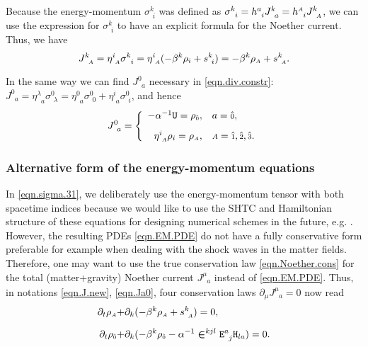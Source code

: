 \documentclass[
10pt, %
a4paper, %
oneside, %
twocolumn,
headinclude,footinclude, %
BCOR5mm, %
]{scrartcl}
\newcommand{\sA}{\mathsmaller A}
\newcommand{\pd}[1]{\partial_{#1}}
\newcommand{\tetrsymbol}{h}
\newcommand{\itetrsymbol}{\eta}
\newcommand{\itetr}[2]{\itetrsymbol^{#1}_{\phantom{#1}#2}}
\newcommand{\tetr}[2]{\tetrsymbol^{#1}_{\phantom{#1}#2}}
\newcommand{\stress}[2]{s_{\ #1}^{#2}}
\newcommand{\Hfin}[2]{\mathtt{H}_{#2#1}}	%
\newcommand{\Efin}[2]{\mathtt{E}^{#1}_{\phantom{#1}#2}}	%
\newcommand{\Ufin}{\mathtt{U}}
\newcommand{\EMmat}[2]{\sigma^{#1}_{\ \,#2}}
\newcommand{\LCsymb}{\bm{\in}}    %
\newcommand{\NC}[2]{J^{#2}_{\phantom{#2}#1}}
\newcommand{\indalg}[1]{\hat{\mathsmaller{#1}}}
\newcommand{\shift}[1]{\beta^{#1}}
\begin{document}
	Because the energy-momentum $ \EMmat{k}{i} $ was defined as $ \EMmat{k}{i} = \tetr{a}{i} 
	\NC{a}{k} = \tetr{\sA}{i} \NC{\sA}{k} $, we can use the expression for $ \EMmat{k}{i} $ to have 
	an 
	explicit formula for the Noether current. Thus, we have
	\begin{equation}\label{eqn.J.new}
		\NC{\sA}{k} = \itetr{i}{\sA} \EMmat{k}{i} = \itetr{i}{\sA} (-\shift{k} \rho_i + 
		\stress{i}{k} ) 
		= 
		-\shift{k} \rho_{\sA} + \stress{\sA}{k}.
	\end{equation}
	
	In the same way we can find $ \NC{a}{0} $ necessary in \eqref{eqn.div.constr}: $ \NC{a}{0} = 
	\itetr{\lambda}{a} \EMmat{0}{\lambda} = \itetr{0}{a} \EMmat{0}{0} + \itetr{i}{a} \EMmat{0}{i}$, 
	and 
	hence
	\begin{equation}\label{eqn.Ja0}
		\NC{a}{0} = \left\{
		\begin{array}{rl}
			-\alpha^{-1} \Ufin=\rho_{\indalg{0}},	& a=\indalg{0},  \\[3mm] 
			\itetr{i}{\sA} \rho_i = \rho_{\sA}, & \sA=\indalg{1},\indalg{2},\indalg{3}. \\ 
		\end{array} 
		\right.
	\end{equation}
	

	\subsubsection{Alternative form of the energy-momentum equations}
	
	In \eqref{eqn.sigma.31}, we deliberately use the energy-momentum tensor with
	both spacetime indices because we would like to use the SHTC and Hamiltonian
	structure \cite{SHTC-GENERIC-CMAT} of these equations for designing
	numerical schemes in the future, e.g. \cite{HTC2022,SPH_SHTC}. However, the
	resulting PDEs \eqref{eqn.EM.PDE} do not have a fully conservative form
	preferable for example when dealing with the shock waves in the matter
	fields. Therefore, one may want to use the true conservation law
	\eqref{eqn.Noether.cons} for the total (matter+gravity) Noether current $
	\NC{a}{\mu} $ instead of \eqref{eqn.EM.PDE}. Thus, in 	notations
	\eqref{eqn.J.new}, \eqref{eqn.Ja0}, four conservation laws $
	\pd{\mu}\NC{a}{\mu} = 0 $ now read
	\begin{subequations}
		\begin{align}
			\pd{t} \rho_\sA + & \pd{k} (-\shift{k} \rho_\sA + \stress{\sA}{k}) = 0,\\[2mm]
			\pd{t} \rho_{\indalg{0}} + & \pd{k} (-\shift{k} \rho_{\indalg{0}} 
			- \alpha^{-1} 
			\LCsymb^{kjl}\Efin{a}{j}\Hfin{a}{l} ) = 0.
		\end{align}
	\end{subequations}
	
\end{document}
